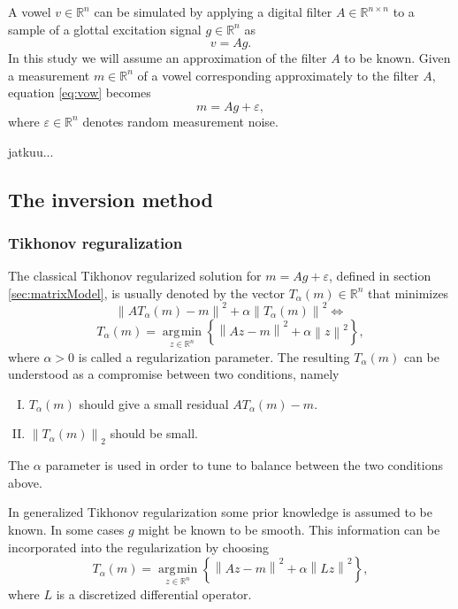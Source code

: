 \documentclass[12pt,a4]{article}
\DeclareMathOperator*{\argmin}{\arg\!\min}
\newcommand{\R}{{\mathbb R}}
\newcommand{\lnorm}{\left\|}
\newcommand{\rnorm}{\right\|}
\newcommand{\eps}{\ensuremath{\varepsilon}}
\begin{document}
A vowel $v\in\R^n$ can be simulated by applying a digital filter $A\in\R^{n \times n}$ to a sample of a glottal excitation signal $g\in\R^n$ as
\begin{equation}
\label{eq:vow}
v = A g.
\end{equation}
In this study we will assume an approximation of the filter $A$ to be known. Given a measurement $m\in\R^n$ of a vowel corresponding approximately to the filter $A$, equation \eqref{eq:vow} becomes
\begin{equation}
\label{eq:vowModel}
m = A g + \eps,
\end{equation}
where $\eps\in\R^n$ denotes random measurement noise.

jatkuu...

\subsection{The inversion method}\label{sec:invMethod}

\subsubsection{Tikhonov reguralization}\label{sec:tikh}
The classical Tikhonov regularized solution for $m = Ag + \varepsilon$, defined in section \ref{sec:matrixModel}, is usually denoted by the vector $T_\alpha(m)\in\R^n$ that minimizes
\begin{equation*}
\lnorm AT_\alpha(m) - m \rnorm^2 + \alpha \lnorm T_\alpha(m) \rnorm^2 \Leftrightarrow
\end{equation*}
\begin{equation*}
T_\alpha(m) = \underset{z\in\R^n}{\argmin}
\left\{ \lnorm Az - m \rnorm^2 + \alpha \lnorm z \rnorm^2 \right\},
\end{equation*}
where $\alpha > 0$ is called a regularization parameter. The resulting $T_\alpha(m)$ can be understood as a compromise between two conditions, namely
\begin{enumerate}[I.]
 \item $T_\alpha(m)$ should give a small residual $AT_\alpha(m) - m$.
 \item $\lnorm T_\alpha(m) \rnorm_2$ should be small.
\end{enumerate}
The $\alpha$ parameter is used in order to tune to balance between the two conditions above.

In generalized Tikhonov regularization some prior knowledge is assumed to be known. In some cases $g$ might be known to be smooth. This information can be incorporated into the regularization by choosing
\begin{equation}
T_\alpha(m) = \underset{z\in\R^n}{\argmin}
\left\{ \lnorm Az - m \rnorm^2 + \alpha \lnorm Lz \rnorm^2 \right\},
\end{equation}  
where $L$ is a discretized differential operator.
 
\end{document}
